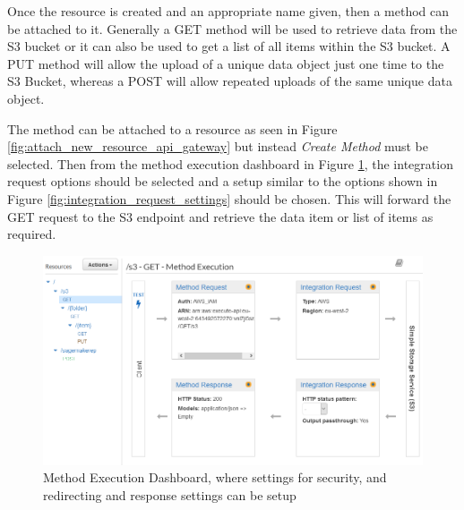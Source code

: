 Once the resource is created and an appropriate name given, then a method can be attached to it. Generally a GET method will be used to retrieve data from the S3 bucket or it can also be used to get a list of all items within the S3 bucket. A PUT method will allow the upload of a unique data object just one time to the S3 Bucket, whereas a POST will allow repeated uploads of the same unique data object. 

The method can be attached to a resource as seen in Figure \ref{fig:attach_new_resource_api_gateway} but instead \textit{Create Method} must be selected. Then from the method execution dashboard in Figure \ref{fig:api_gateway_integration_req}, the integration request options should be selected and a setup similar to the options shown in Figure \ref{fig:integration_request_settings} should be chosen. This will forward the GET request to the S3 endpoint and retrieve the data item or list of items as required.

\begin{figure}[ht]
    \centering
\includegraphics[width=1\linewidth]{pages/Chapter4/Chapter 4 Images/get_method_execution_1.png}
    \caption{Method Execution Dashboard, where settings for security, and redirecting and response settings can be setup}
    \label{fig:api_gateway_integration_req}
\end{figure}


